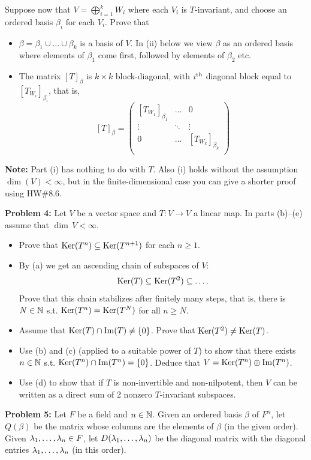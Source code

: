 \documentclass[11pt]{amsart}
\begin{document}
Suppose now that $V=\bigoplus\limits_{i=1}^k W_i$ where each $V_i$ is $T$-invariant, and choose an ordered basis $\beta_i$ for each $V_i$.
Prove that 
\begin{itemize}
\item[(i)] $\beta=\beta_1\cup\ldots\cup\beta_k$ is a basis of $V$. In (ii) below we view $\beta$ as an ordered basis where elements of 
$\beta_1$ come first, followed by elements of $\beta_2$ etc.
\item[(ii)] The matrix $[T]_{\beta}$ is $k\times k$ block-diagonal, with $i^{\rm th}$ diagonal block equal to $[T_{W_i}]_{\beta_i}$,
that is,
$$[T]_{\beta}=\begin{pmatrix}
{[T_{W_1}]}_{\beta_1} & \ldots & 0\\
\vdots & \ddots & \vdots\\
0 & \ldots & {[T_{W_k}]}_{\beta_k}\\
\end{pmatrix}$$
\end{itemize}
{\bf Note:} Part (i) has nothing to do with $T$. Also (i) holds without the assumption $\dim(V)<\infty$, but in the finite-dimensional
case you can give a shorter proof using HW\#8.6.
\skv

\skv
{\bf Problem 4:} Let $V$ be a vector space and $T:V\to V$ a linear map. In parts (b)--(e) assume that $\dim\, V<\infty$.
\begin{itemize}
\item[(a)] Prove that ${\rm Ker}(T^n)\subseteq {\rm Ker}(T^{n+1})$ for each $n\geq 1$.
\item[(b)] By (a) we get an ascending chain of subspaces of $V$: $${\rm Ker}(T)\subseteq {\rm Ker}(T^2)\subseteq \ldots .$$
Prove that this chain stabilizes after finitely many steps, that is, there is $N\in{\mathbb N}$ s.t. ${\rm Ker}(T^n)= {\rm Ker}(T^{N})$
for all $n\geq N$.
\item[(c)] Assume that ${\rm Ker}(T)\cap {\rm Im}(T)\neq \{0\}$. Prove that ${\rm Ker}(T^2)\neq {\rm Ker}(T)$.
\item[(d)] Use (b) and (c) (applied to a suitable power of $T$) to show that there exists $n\in{\mathbb N}$ s.t. ${\rm Ker}(T^n)\cap {\rm Im}(T^n)=\{0\}$. Deduce that $V={\rm Ker}(T^n)\oplus {\rm Im}(T^n)$. 
\item[(e)] Use (d) to show that if $T$ is non-invertible and non-nilpotent, then $V$ can be written as a direct sum of 2 nonzero
$T$-invariant subspaces.
\end{itemize}
\skv
{\bf Problem 5:} Let $F$ be a field and $n\in{\mathbb N}$. Given an ordered basis $\beta$ of $F^n$, let $Q(\beta)$ be the matrix whose columns are the elements of $\beta$ (in the given order). Given ${\lambda}_1,\ldots,{\lambda}_n\in F$, let $D({\lambda}_1,\ldots,{\lambda}_n)$ be the diagonal matrix with the diagonal entries ${\lambda}_1,\ldots,{\lambda}_n$ (in this order).
\end{document}
